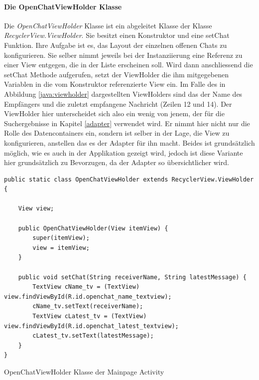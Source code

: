 \documentclass[a4paper,11pt]{report}
\newenvironment{code}{\captionsetup{type=figure}}{}
\begin{document}
			\paragraph{Die OpenChatViewHolder Klasse}\label{OpenChatViewHolder}
			Die \emph{OpenChatViewHolder} Klasse ist ein abgeleitet Klasse der Klasse \emph{RecyclerView.ViewHolder}. Sie besitzt einen Konstruktor und eine setChat Funktion. Ihre Aufgabe ist es, das Layout der einzelnen offenen Chats zu konfigurieren. Sie selber nimmt jeweils bei der Instanziierung eine Referenz zu einer View entgegen, die in der Liste erscheinen soll. Wird dann anschliessend die setChat Methode aufgerufen, setzt der ViewHolder die ihm mitgegebenen Variablen in die vom Konstruktor referenzierte View ein. Im Falle des in Abbildung \ref{java:viewholder} dargestellten ViewHolders sind das der Name des Empfängers und die zuletzt empfangene Nachricht (Zeilen 12 und 14). Der ViewHolder hier unterscheidet sich also ein wenig von jenem, der für die Suchergebnisse in Kapitel \ref{adapter} verwendet wird. Er nimmt hier nicht nur die Rolle des Datencontainers ein, sondern ist selber in der Lage, die View zu konfigurieren, anstellen das es der Adapter für ihn macht. Beides ist grundsätzlich möglich, wie es auch in der Applikation gezeigt wird, jedoch ist diese Variante hier grundsätzlich zu Bevorzugen, da der Adapter so übersichtlicher wird.
\begin{code}
	\begin{center}
		\begin{verbatim}
public static class OpenChatViewHolder extends RecyclerView.ViewHolder {
		
	View view;
		
	public OpenChatViewHolder(View itemView) {
		super(itemView);
		view = itemView;
	}
		
	public void setChat(String receiverName, String latestMessage) {
		TextView cName_tv = (TextView) view.findViewById(R.id.openchat_name_textview);
		cName_tv.setText(receiverName);
		TextView cLatest_tv = (TextView) view.findViewById(R.id.openchat_latest_textview);
		cLatest_tv.setText(latestMessage);
	}
}
		\end{verbatim}
		\caption{OpenChatViewHolder Klasse der Mainpage Activity}\label{java:viewholder}
	\end{center}
\end{code}			
			
\end{document}
